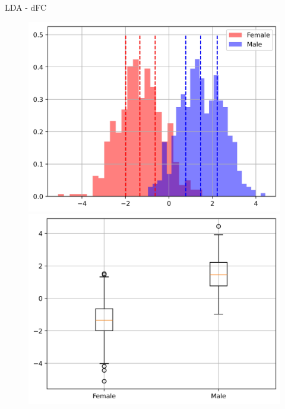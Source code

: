 \documentclass{beamer}
\begin{document}
\begin{frame}{LDA - dFC}
\begin{figure}[H]
{\begin{minipage}[b]{0.3\textwidth}
                \includegraphics[width=1\textwidth]{../Analysis/LDA/node=25_size=480_step=180_rho=0.1/hist_6.jpg}
                \includegraphics[width=1\textwidth]{../Analysis/LDA/node=25_size=480_step=180_rho=0.1/box_6.jpg}
            \end{minipage}
        }
\end{figure}
\end{frame}
\end{document}
